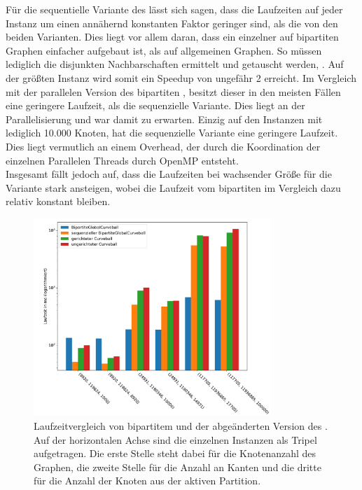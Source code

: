 Für die sequentielle Variante des \gc{} lässt sich sagen, dass die Laufzeiten auf jeder Instanz um
einen annähernd konstanten Faktor geringer sind, als die von den beiden \cb{} Varianten. 
Dies liegt vor allem daran, 
dass ein einzelner \ct{} auf bipartiten Graphen einfacher aufgebaut ist, als auf allgemeinen Graphen.
So müssen lediglich die disjunkten Nachbarschaften ermittelt und getauscht werden, .
Auf der größten Instanz wird somit ein Speedup von ungefähr 2 erreicht.
Im Vergleich mit der parallelen Version des bipartiten \gc{}, besitzt dieser in den meisten Fällen
eine geringere Laufzeit, als die sequenzielle Variante. Dies liegt an der Parallelisierung und
war damit zu erwarten. Einzig auf den Instanzen mit lediglich 10.000 Knoten, hat die sequenzielle
Variante eine geringere Laufzeit. Dies liegt vermutlich an einem Overhead, der durch die Koordination
der einzelnen Parallelen Threads durch OpenMP entsteht.
\\

Insgesamt fällt jedoch auf, dass die Laufzeiten bei wachsender Größe für die \cb{}
Variante stark ansteigen, wobei die Laufzeit vom bipartiten \gc{} im Vergleich dazu
relativ konstant bleiben.
\begin{figure}
\centering
	\includegraphics[width = 0.8\textwidth]{figures/speedup.pdf}
	\caption[Laufzeitvergleich von bipartitem \gc{} und einer abgeänderten Variante von \cb{}]{Laufzeitvergleich von bipartitem \gc{} und der abgeänderten Version des .{}
	Auf der horizontalen Achse sind die einzelnen Instanzen als Tripel aufgetragen.
Die erste Stelle steht dabei für die Knotenanzahl des Graphen, 
die zweite Stelle für die Anzahl an Kanten und die dritte für die Anzahl der Knoten aus 
der aktiven Partition.}
	\label{fig:speedup_komplett}
\end{figure}

